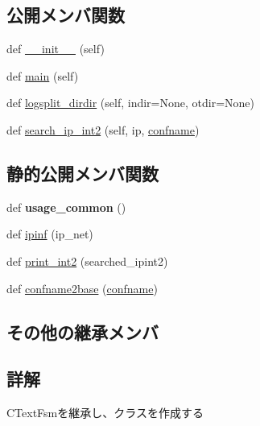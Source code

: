 \subsection*{公開メンバ関数}
\begin{DoxyCompactItemize}
\item 
def \mbox{\hyperlink{classCiscoConf_1_1CiscoCommon_a67ee86ca701af50e95bed0abfcd09dda}{\+\_\+\+\_\+init\+\_\+\+\_\+}} (self)
\item 
def \mbox{\hyperlink{classCiscoConf_1_1CiscoCommon_a1bfe0207baec9f926f5dbea8c0f9e503}{main}} (self)
\item 
def \mbox{\hyperlink{classCiscoConf_1_1CiscoCommon_a531da618ef913a6f96c313a12cda2d78}{logsplit\+\_\+dirdir}} (self, indir=None, otdir=None)
\item 
def \mbox{\hyperlink{classCiscoConf_1_1CiscoCommon_acb6b75d07a3f0c643b3527ea81516d9a}{search\+\_\+ip\+\_\+int2}} (self, ip, \mbox{\hyperlink{classCTextFsm_1_1CTextFsm_afaf1b7c90c7fc6173ecc700966132c5c}{confname}})
\end{DoxyCompactItemize}
\subsection*{静的公開メンバ関数}
\begin{DoxyCompactItemize}
\item 
\mbox{\label{classCiscoConf_1_1CiscoCommon_a7dcb8e68d8bf4f16b954e059cc63b138}} 
def {\bfseries usage\+\_\+common} ()
\item 
def \mbox{\hyperlink{classCiscoConf_1_1CiscoCommon_a49f3f3f5f53737dfdca08f3840c01237}{ipinf}} (ip\+\_\+net)
\item 
def \mbox{\hyperlink{classCiscoConf_1_1CiscoCommon_af1925c9fc6e13cb0d77746440bec1249}{print\+\_\+int2}} (searched\+\_\+ipint2)
\item 
def \mbox{\hyperlink{classCiscoConf_1_1CiscoCommon_a8cec30496e624ec5d237f05e09dc344b}{confname2base}} (\mbox{\hyperlink{classCTextFsm_1_1CTextFsm_afaf1b7c90c7fc6173ecc700966132c5c}{confname}})
\end{DoxyCompactItemize}
\subsection*{その他の継承メンバ}


\subsection{詳解}
\begin{DoxyVerb}CTextFsmを継承し、クラスを作成する
\end{DoxyVerb}
 

